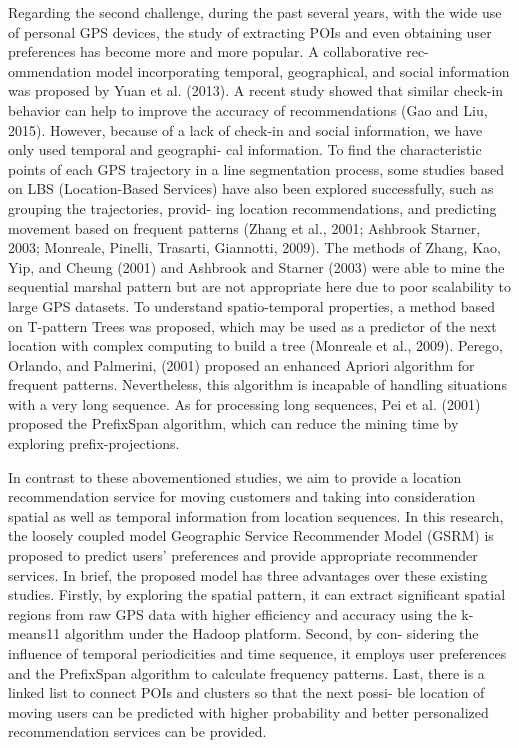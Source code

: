 \documentclass[conference]{IEEEtran}
\begin{document}
  Regarding the second challenge, during the past several years, with the wide use of personal GPS devices, the study of extracting POIs and even 
obtaining 
user preferences has become more and more popular. A collaborative rec- ommendation model incorporating temporal, geographical, and social information 
was proposed by Yuan et al. (2013). A recent study showed that similar check-in behavior can help to improve the accuracy of recommendations (Gao and 
Liu, 2015). However, because of a lack of check-in and social information, we have only used temporal and geographi- cal information. To find the 
characteristic points of each GPS trajectory in a line segmentation process, some studies based on LBS (Location-Based Services) have also been explored 
successfully, such as grouping the trajectories, provid- ing location recommendations, and predicting movement based on frequent patterns (Zhang et al., 
2001; Ashbrook  Starner, 2003; Monreale, Pinelli, Trasarti,  Giannotti, 2009). The methods of Zhang, Kao, Yip, and Cheung (2001) and Ashbrook and 
Starner (2003) were able to mine the sequential marshal pattern but are not appropriate here due to poor scalability to large GPS datasets. To understand 
spatio-temporal properties, a method based on T-pattern Trees was proposed, which may be used as a predictor of the next location with complex computing 
to build a tree (Monreale et al., 2009). Perego, Orlando, and Palmerini, (2001) proposed an enhanced Apriori algorithm for frequent patterns. 
Nevertheless, this algorithm is incapable of handling situations with a very long sequence. As for processing long sequences, Pei et al. (2001) proposed 
the PrefixSpan algorithm, which can reduce the mining time by exploring prefix-projections.

  In contrast to these abovementioned studies, we aim to provide a location recommendation service for moving customers and taking into consideration 
spatial as well as temporal information from location sequences. In this research, the loosely coupled model Geographic Service Recommender Model (GSRM) 
is proposed to predict users’ preferences and provide appropriate recommender services. In brief, the proposed model has three advantages over these 
existing studies. Firstly, by exploring the spatial pattern, it can extract significant spatial regions from raw GPS data with higher efficiency and 
accuracy using the k-means11 algorithm under the Hadoop platform. Second, by con- sidering the influence of temporal periodicities and time sequence, it 
employs user preferences and the PrefixSpan algorithm to calculate frequency patterns. Last, there is a linked list to connect POIs and clusters so that 
the next possi- ble location of moving users can be predicted with higher probability and better personalized recommendation services can be provided.
\end{document}
